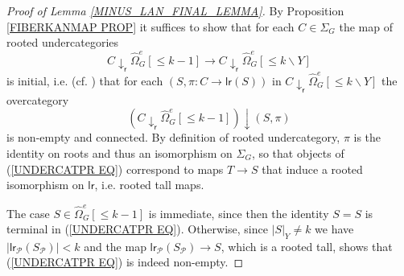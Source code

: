 \documentclass[a4paper,10pt]{article}%
\begin{document}
\begin{proof}[Proof of Lemma \ref{MINUS_LAN_FINAL_LEMMA}]

By Proposition \ref{FIBERKANMAP PROP} it suffices to
show that for each $C \in \Sigma_G$
the map of rooted undercategories
\[
C \downarrow_{\mathsf{r}} \widehat{\Omega}_G^e[\leq\! k-1]
	\to 
C \downarrow_{\mathsf{r}} \widehat{\Omega}_G^e[\leq\! k \mathbin{\backslash} Y]
\]
is initial, i.e. 
(cf. \cite[IX.3]{McL}) that for each
$(S,\pi \colon C \to \mathsf{lr}(S))$ in 
$C \downarrow_{\mathsf{r}} \widehat{\Omega}_G^e[\leq\! k \mathbin{\backslash} Y]$
the overcategory
\begin{equation}\label{UNDERCATPR EQ}
	(C \downarrow_{\mathsf{r}} \widehat{\Omega}_G^e[\leq\! k-1])
		\downarrow
	(S,\pi)  
\end{equation}
is non-empty and connected. 
By definition of rooted undercategory, $\pi$ is the identity on roots and thus an isomorphism on $\Sigma_G$,
so that objects of (\ref{UNDERCATPR EQ})
correspond to maps
$T \to S$
that induce a rooted isomorphism on 
$\mathsf{lr}$, i.e. rooted tall maps.

The case $S\in \widehat{\Omega}_G^e[\leq\! k-1]$ is immediate,
since then the identity $S = S$ is terminal in 
(\ref{UNDERCATPR EQ}).
Otherwise, since $|S|_Y \neq k$ we have
$|\mathsf{lr}_{\mathcal{P}}(S_{\mathcal{P}})|<k$
and the map 
$\mathsf{lr}_{\mathcal{P}}(S_{\mathcal{P}}) \to S$,
which is a rooted tall, shows that
(\ref{UNDERCATPR EQ}) is indeed non-empty.


\end{proof}
\end{document}
